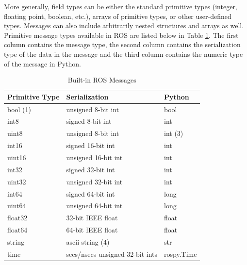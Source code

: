 More generally, field types can be either the standard primitive types (integer, floating point, boolean, etc.), arrays of primitive types, or other user-defined types. Messages can also include arbitrarily nested structures and arrays as well. Primitive message types available in ROS are listed below in Table \ref{table:Built-in Messages}. The first column contains the message type, the second column contains the serialization type of the data in the message and the third column contains the numeric type of the message in Python.

\begin{table}[ht]
\centering
\begin{tabular}{lll}
\hline
\textbf{Primitive Type} & \textbf{Serialization}          & \textbf{Python} \\ \hline
bool (1)                & unsigned 8-bit int              & bool            \\
int8                    & signed 8-bit int                & int             \\
uint8                   & unsigned 8-bit int              & int (3)         \\
int16                   & signed 16-bit int               & int             \\
uint16                  & unsigned 16-bit int             & int             \\
int32                   & signed 32-bit int               & int             \\
uint32                  & unsigned 32-bit int             & int             \\
int64                   & signed 64-bit int               & long            \\
uint64                  & unsigned 64-bit int             & long            \\
float32                 & 32-bit IEEE float               & float           \\
float64                 & 64-bit IEEE float               & float           \\
string                  & ascii string (4)                & str             \\
time                    & secs/nsecs unsigned 32-bit ints & rospy.Time      \\ \hline
\end{tabular}
\caption{Built-in ROS Messages} \label{table:Built-in Messages}
\end{table}

